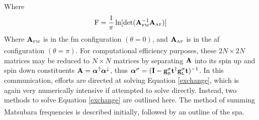 \documentclass[a4paper, 12pt]{article}
\begin{document}
Where
\begin{equation}\label{F}
	\rm F = \frac{1}{\pi}\ln [det(\bf A_{\rm \scriptscriptstyle FM}^{\rm -1}A_{\rm \scriptscriptstyle AF})]
\end{equation}
Where $\bf A_{\rm \scriptscriptstyle FM}$ is in the \gls{fm} configuration $(\theta = 0)$, and $\bf A_{\rm \scriptscriptstyle AF}$ is in the \gls{af} configuration $(\theta = \pi)$\textcolor{blue}{\textsuperscript{\cite{rev3}}}. For computational efficiency purposes, these $2N\times2N$ matrices may be reduced to $N\times N$ matrices by separating $\bf A$ into its spin up and spin down constituents $\bf A = \bm \alpha^\uparrow \bm\alpha^\downarrow$,
thus $\bm \alpha^\sigma = \bf(I - g_{\rm\scriptscriptstyle R}^\sigma t^\dag g_{\rm\scriptscriptstyle L}^\sigma t)^{\rm-1}$.
In this communication, efforts are directed at solving Equation \eqref{exchange}, which is again very numerically intensive if attempted to solve directly. Instead, two methods to solve Equation \eqref{exchange} are outlined here. The method of summing Matsubara frequencies is described initially\textcolor{blue}{\textsuperscript{\cite{mats}}}, followed by an outline of the \gls{spa}\textcolor{blue}{\textsuperscript{\cite{rev1}}}.
\end{document}
